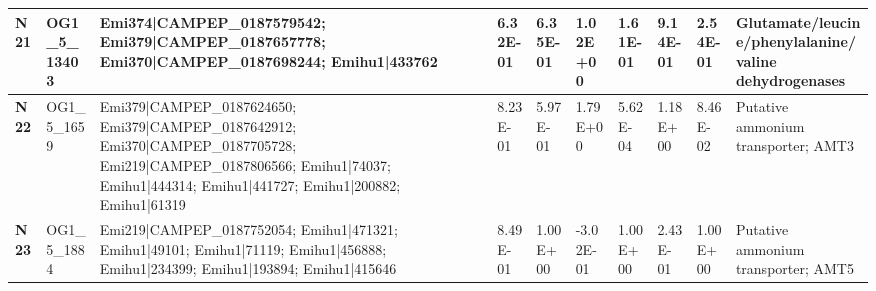 \begin{landscape}
\begin{center}
\begin{footnotesize}
\begin{longtable}{|p{0.5cm}|p{1.5cm}|p{4cm}|l|l|l|l|l|l|l|}
\textbf{N21} & OG1\_5\_13403 & Emi374|CAMPEP\_0187579542; Emi379|CAMPEP\_0187657778; Emi370|CAMPEP\_0187698244; Emihu1|433762                                                                                                                                                                                                                                                                                                                                                                                                                                                                                                                                           & 6.32E-01  & 6.35E-01 & 1.02E+00  & 1.61E-01 & 9.14E-01  & 2.54E-01 & Glutamate/leucine/phenylalanine/valine dehydrogenases                        \\ \hline
\textbf{N22} & OG1\_5\_1659  & Emi379|CAMPEP\_0187624650; Emi379|CAMPEP\_0187642912; Emi370|CAMPEP\_0187705728; Emi219|CAMPEP\_0187806566; Emihu1|74037; Emihu1|444314; Emihu1|441727; Emihu1|200882; Emihu1|61319                                                                                                                                                                                                                                                                                                                                                                                                                                                      & 8.23E-01  & 5.97E-01 & 1.79E+00  & 5.62E-04 & 1.18E+00  & 8.46E-02 & Putative ammonium transporter; AMT3                                          \\ \hline
\textbf{N23} & OG1\_5\_1884  & Emi219|CAMPEP\_0187752054; Emihu1|471321; Emihu1|49101; Emihu1|71119; Emihu1|456888; Emihu1|234399; Emihu1|193894; Emihu1|415646                                                                                                                                                                                                                                                                                                                                                                                                                                                                                                         & 8.49E-01  & 1.00E+00 & -3.02E-01 & 1.00E+00 & 2.43E-01  & 1.00E+00 & Putative ammonium transporter; AMT5                                          \\ \hline

\end{longtable}
\end{footnotesize}
\end{center}
\end{landscape}
